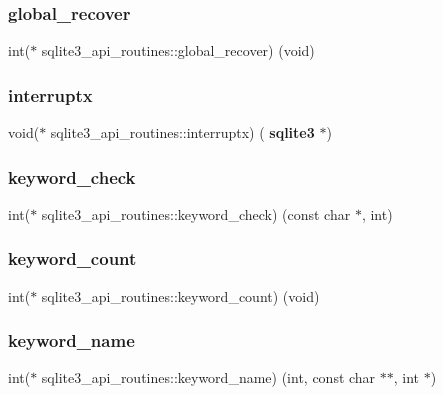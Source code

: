 \subsubsection{global\_recover}
{\footnotesize\ttfamily int($\ast$ sqlite3\+\_\+api\+\_\+routines\+::global\+\_\+recover) (void)}

\mbox{\label{structsqlite3__api__routines_adab3cdd36976fa72f7e6662f597818ea}} 
\subsubsection{interruptx}
{\footnotesize\ttfamily void($\ast$ sqlite3\+\_\+api\+\_\+routines\+::interruptx) (\textbf{ sqlite3} $\ast$)}

\mbox{\label{structsqlite3__api__routines_ab1f86cd77d1048b954016670d85e2333}} 
\subsubsection{keyword\_check}
{\footnotesize\ttfamily int($\ast$ sqlite3\+\_\+api\+\_\+routines\+::keyword\+\_\+check) (const char $\ast$, int)}

\mbox{\label{structsqlite3__api__routines_a2fbb90e95d2849a4ac1ed2fdcd2a796d}} 
\subsubsection{keyword\_count}
{\footnotesize\ttfamily int($\ast$ sqlite3\+\_\+api\+\_\+routines\+::keyword\+\_\+count) (void)}

\mbox{\label{structsqlite3__api__routines_af7be5ba4689e6c27894eae7b441f5f65}} 
\subsubsection{keyword\_name}
{\footnotesize\ttfamily int($\ast$ sqlite3\+\_\+api\+\_\+routines\+::keyword\+\_\+name) (int, const char $\ast$$\ast$, int $\ast$)}


